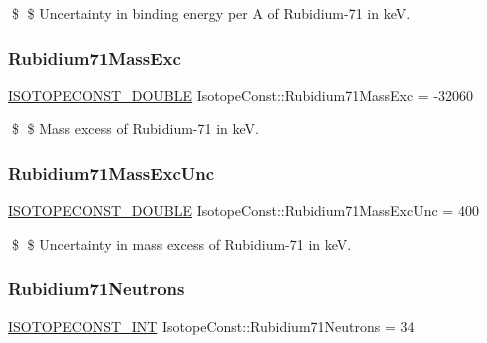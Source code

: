 \$ \$ Uncertainty in binding energy per A of Rubidium-\/71 in keV. \mbox{\label{group___isotope_const-_rubidium-_rb71_gaefb5711f78302d0f24ff42c8e301771c}} 
\subsubsection{\texorpdfstring{Rubidium71\+Mass\+Exc}{Rubidium71MassExc}}
{\footnotesize\ttfamily \mbox{\hyperlink{group___isotope_const-_macros_ga8f45a7272ce02c0b4c65c44636ed719a}{I\+S\+O\+T\+O\+P\+E\+C\+O\+N\+S\+T\+\_\+\+D\+O\+U\+B\+LE}} Isotope\+Const\+::\+Rubidium71\+Mass\+Exc = -\/32060}

\$ \$ Mass excess of Rubidium-\/71 in keV. \mbox{\label{group___isotope_const-_rubidium-_rb71_ga05b777ae7f812d408f5b586af6aec12e}} 
\subsubsection{\texorpdfstring{Rubidium71\+Mass\+Exc\+Unc}{Rubidium71MassExcUnc}}
{\footnotesize\ttfamily \mbox{\hyperlink{group___isotope_const-_macros_ga8f45a7272ce02c0b4c65c44636ed719a}{I\+S\+O\+T\+O\+P\+E\+C\+O\+N\+S\+T\+\_\+\+D\+O\+U\+B\+LE}} Isotope\+Const\+::\+Rubidium71\+Mass\+Exc\+Unc = 400}

\$ \$ Uncertainty in mass excess of Rubidium-\/71 in keV. \mbox{\label{group___isotope_const-_rubidium-_rb71_ga4bfa3d477d1b1bfdcc3e89b906b71982}} 
\subsubsection{\texorpdfstring{Rubidium71\+Neutrons}{Rubidium71Neutrons}}
{\footnotesize\ttfamily \mbox{\hyperlink{group___isotope_const-_macros_ga5f18360b3e99483a35c32d789e62621c}{I\+S\+O\+T\+O\+P\+E\+C\+O\+N\+S\+T\+\_\+\+I\+NT}} Isotope\+Const\+::\+Rubidium71\+Neutrons = 34}

